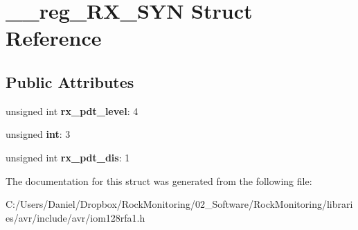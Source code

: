 \hypertarget{struct____reg___r_x___s_y_n}{}\section{\+\_\+\+\_\+reg\+\_\+\+R\+X\+\_\+\+S\+YN Struct Reference}
\label{struct____reg___r_x___s_y_n}
\subsection*{Public Attributes}
\begin{DoxyCompactItemize}
\item 
unsigned int {\bfseries rx\+\_\+pdt\+\_\+level}\+: 4\hypertarget{struct____reg___r_x___s_y_n_adae44bf45f88213c048b4617ff6649e0}{}\label{struct____reg___r_x___s_y_n_adae44bf45f88213c048b4617ff6649e0}

\item 
unsigned {\bfseries int}\+: 3\hypertarget{struct____reg___r_x___s_y_n_a295454d324ce75a10535bc94488357dd}{}\label{struct____reg___r_x___s_y_n_a295454d324ce75a10535bc94488357dd}

\item 
unsigned int {\bfseries rx\+\_\+pdt\+\_\+dis}\+: 1\hypertarget{struct____reg___r_x___s_y_n_a6621031134d3e26d1c5f0c3779027e9d}{}\label{struct____reg___r_x___s_y_n_a6621031134d3e26d1c5f0c3779027e9d}

\end{DoxyCompactItemize}


The documentation for this struct was generated from the following file\+:\begin{DoxyCompactItemize}
\item 
C\+:/\+Users/\+Daniel/\+Dropbox/\+Rock\+Monitoring/02\+\_\+\+Software/\+Rock\+Monitoring/libraries/avr/include/avr/iom128rfa1.\+h\end{DoxyCompactItemize}
